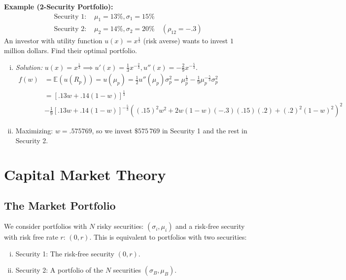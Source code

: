 \textbf{Example (2-Security Portfolio): }
\begin{align*}
    \text{Security 1: }& \mu_1 = 13\%, \sigma_1 = 15\% \\
    \text{Security 2: }& \mu_2 = 14\%, \sigma_2 = 20\% \quad (\rho_{12} = -.3)
\end{align*}
An investor with utility function \(u(x) = x^{\frac{1}{3}}\) (risk averse) wants to invest \(1\) million dollars. Find their optimal portfolio.
\begin{enumerate}[i.]
    \item \textit{Solution: } \(u(x) = x^{\frac{1}{3}} \implies u'(x) = \frac{1}{3}x^{-\frac{2}{3}}, u''(x) = -\frac{2}{9}x^{-\frac{5}{3}}\).
    \begin{align*}
        f(w) &= \mathbb{E}(u(R_p)) = u(\mu_p) = \frac{1}{2}u''(\mu_p)\sigma_p^2 = \mu_p^{\frac{1}{3}} - \frac{1}{9}\mu_p^{-\frac{5}{3}}\sigma_p^2 \\
        &= [.13w + .14(1-w)]^{\frac{1}{3}} \\
        &- \frac{1}{9}[.13w + .14(1-w)]^{-\frac{5}{3}}((.15)^2w^2 + 2w(1-w)(-.3)(.15)(.2) + (.2)^2(1-w)^2)^2
    \end{align*}
    \item Maximizing: \(w = .575769\), so we invest \(\$575\,769\) in Security 1 and the rest in Security 2.
\end{enumerate}

\section{Capital Market Theory}
\subsection{The Market Portfolio}
We consider portfolios with \(N\) risky securities: \((\sigma_i, \mu_i)\) and a risk-free security with risk free rate \(r\): \((0, r)\). This is equivalent to portfolios with two securities:
\begin{enumerate}[i.]
    \item Security 1: The risk-free security \((0,r)\).
    \item Security 2: A portfolio of the \(N\) securities \((\sigma_B, \mu_B)\).
\end{enumerate}

